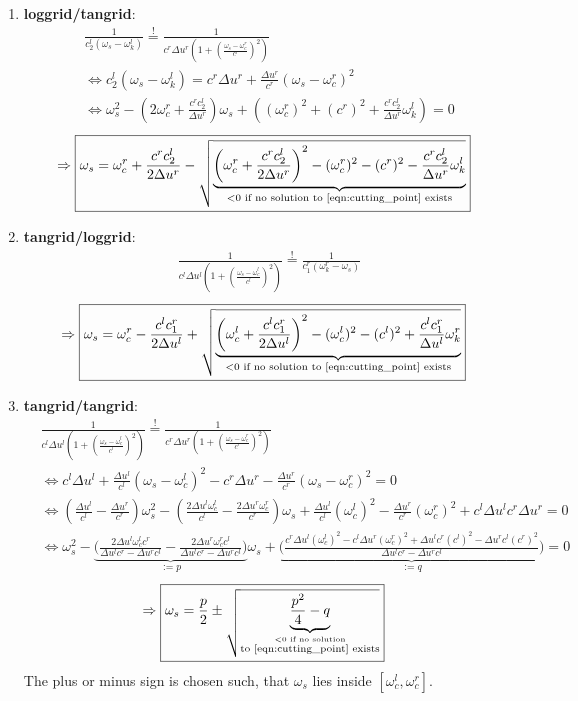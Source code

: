 \begin{enumerate}
	\item {\bf loggrid/tangrid}:
		\begin{align*}
			&\frac{1}{c_2^l(\omega_s-\omega_k^l)}\stackrel{!}{=}\frac{1}{c^r\Delta u^r\left(1+\left(\frac{\omega_s-\omega_c^r}{c^r}\right)^2\right)}\\
			&\Leftrightarrow c_2^l(\omega_s-\omega_k^l) = c^r \Delta u^r + \frac{\Delta u^r}{c^r} (\omega_s-\omega_c^r)^2\\
			&\Leftrightarrow \omega_s^2 - \left(2\omega_c^r + \frac{c^r c_2^l}{\Delta u^r}\right) \omega_s + \left((\omega_c^{r})^2 + (c^r)^2 + \frac{c^r c_2^l}{\Delta u^r} \omega_k^l \right) =0
		\end{align*}
		\[
		 	\Rightarrow \boxed{\omega_s= \omega_c^r + \frac{c^r c_2^l}{2 \Delta u^r} - \sqrt{\underbrace{\left(\omega_c^r + \frac{c^r c_2^l}{2 \Delta u^r}\right)^2 - (\omega_c^{r})^2 - (c^r)^2 - \frac{c^r c_2^l}{\Delta u^r} \omega_k^l }_{<0 \text{ if no solution to \ref{eqn:cutting_point} exists}}}}
		\]
	\item {\bf tangrid/loggrid}:
		\begin{align*}
			&\frac{1}{c^l\Delta u^l\left(1+\left(\frac{\omega_s-\omega_c^l}{c^l}\right)^2\right)}\stackrel{!}{=}\frac{1}{c_1^r(\omega_k^r-\omega_s)}
		\end{align*}
		\[
		 	\Rightarrow \boxed{\omega_s= \omega_c^r - \frac{c^l c_1^r}{2 \Delta u^l} + \sqrt{\underbrace{\left(\omega_c^l + \frac{c^l c_1^r}{2 \Delta u^l}\right)^2 - (\omega_c^{l})^2 - (c^l)^2 + \frac{c^l c_1^r}{\Delta u^l} \omega_k^r }_{<0 \text{ if no solution to \ref{eqn:cutting_point} exists}} }}
		\]
	\item {\bf tangrid/tangrid}:
		\begin{align*}
			&\frac{1}{c^l\Delta u^l\left(1+\left(\frac{\omega_s-\omega_c^l}{c^l}\right)^2\right)}\stackrel{!}{=}\frac{1}{c^r\Delta u^r\left(1+\left(\frac{\omega_s-\omega_c^r}{c^r}\right)^2\right)}\\
			&\Leftrightarrow c^l\Delta u^l + \frac{\Delta u^l}{c^l}(\omega_s - \omega_c^l)^2 - c^r \Delta u^r - \frac{\Delta u^r}{c^r}(\omega_s - \omega_c^r)^2 = 0 \\
			&\Leftrightarrow \left( \frac{\Delta u^l}{c^l} - \frac{\Delta u^r}{c^r}\right) \omega_s^2 - \left( \frac{2\Delta u^l \omega_c^l}{c^l} - \frac{2 \Delta u^r \omega_c^r}{c^r} \right) \omega_s + \frac{\Delta u^l}{c^l}(\omega_c^l)^2 - \frac{\Delta u^r}{c^r}(\omega_c^r)^2 + c^l\Delta u^l c^r \Delta u^r = 0\\
			&\Leftrightarrow \omega_s^2 - \underbrace{\biggl(\frac{2\Delta u^l \omega_c^l c^r}{\Delta u^l c^r - \Delta u^r c^l} - \frac{2\Delta u^r \omega_c^r c^l}{\Delta u^l c^r - \Delta u^r c^l} \biggr)}_{:=p} \omega_s + \underbrace{\biggl(\frac{c^r \Delta u^l (\omega_c^l)^2 - c^l \Delta u^r (\omega_c^r)^2 + \Delta u^l c^r (c^l)^2 - \Delta u^r c^l (c^r)^2}{\Delta u^l c^r - \Delta u^r c^l}\biggr)}_{:=q}=0
		\end{align*}
		\[
			\Rightarrow \boxed{\omega_s= \frac{p}{2} \pm \sqrt{\underbrace{\frac{p^2}{4}-q}_{\stackrel{<0 \text{ if no solution}}{\text{to \ref{eqn:cutting_point} exists} } } }}
		\]
		The plus or minus sign is chosen such, that $\omega_s$ lies inside $[\omega_c^l, \omega_c^r]$.


\end{enumerate}
